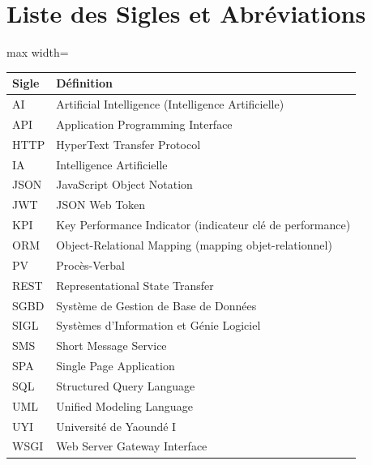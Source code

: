 \documentclass[12pt,a4paper,oneside]{extbook}
\begin{document}
\chapter*{Liste des Sigles et Abréviations}
\begin{table}[H]
   \centering
   \begin{adjustbox}{max width=\textwidth}
   \begin{tabularx}{1.0\textwidth}{|l|X|}
     \hline
     \textbf{Sigle} & \textbf{Définition} \\
     \hline
     AI  & Artificial Intelligence (Intelligence Artificielle) \\
     \hline
     API & Application Programming Interface \\
     \hline
     HTTP & HyperText Transfer Protocol \\
     \hline
     IA  & Intelligence Artificielle \\
     \hline
     JSON & JavaScript Object Notation \\
     \hline
     JWT & JSON Web Token \\
     \hline
     KPI & Key Performance Indicator (indicateur clé de performance) \\
     \hline
     ORM & Object-Relational Mapping (mapping objet-relationnel) \\
     \hline
     PV  & Procès-Verbal \\
     \hline
     REST & Representational State Transfer \\
     \hline
     SGBD & Système de Gestion de Base de Données \\
     \hline
     SIGL & Systèmes d'Information et Génie Logiciel \\
     \hline
     SMS & Short Message Service \\
     \hline
     SPA & Single Page Application \\
     \hline
     SQL & Structured Query Language \\
     \hline
     UML & Unified Modeling Language \\
     \hline
     UYI & Université de Yaoundé I \\
     \hline
     WSGI & Web Server Gateway Interface \\
     \hline
   \end{tabularx}
   \end{adjustbox}
\end{table}

\mainmatter



\appendix

\cleardoublepage
{}
{}


\end{document}
